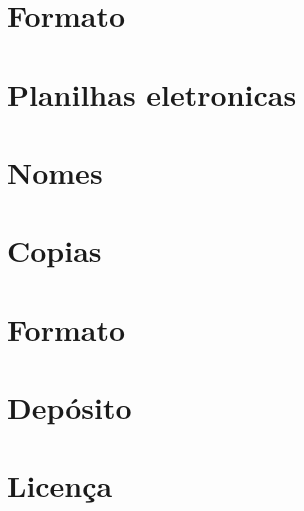 \documentclass[]{book}
\begin{document}
\hypertarget{formato}{%
\section{Formato}\label{formato}}

\hypertarget{planilhas-eletronicas}{%
\section{Planilhas eletronicas}\label{planilhas-eletronicas}}

\hypertarget{nomes}{%
\section{Nomes}\label{nomes}}

\hypertarget{copias}{%
\section{Copias}\label{copias}}

\hypertarget{formato-1}{%
\section{Formato}\label{formato-1}}

\hypertarget{deposito}{%
\section{Depósito}\label{deposito}}

\hypertarget{licenca}{%
\section{Licença}\label{licenca}}


\end{document}

